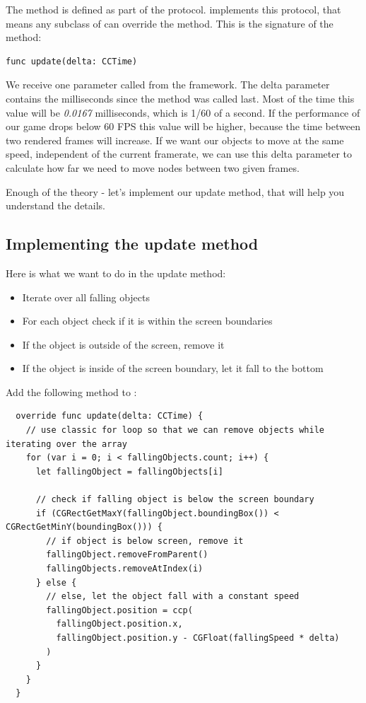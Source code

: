 The  method is defined as part of the
protocol.  implements this protocol, that means any subclass
of  can override the method. This is the signature of the
 method:
\begin{lstlisting}
func update(delta: CCTime)
\end{lstlisting}
We receive one parameter called  from the \cocos{} framework.
The delta parameter contains the milliseconds since the 
method was called last. Most of the time this value will be \textit{0.0167}
milliseconds, which is 1/60 of a second. If the performance of our game drops
below 60 FPS this value will be higher, because the time between two rendered
frames will increase. If we want our objects to move at the same speed,
independent of the current framerate, we can use this delta parameter to
calculate how far we need to move nodes between two given frames.

Enough of the theory - let's implement our update method, that will help you
understand the details.

\subsection{Implementing the update method}
Here is what we want to do in the update method:

\begin{itemize}
  \item Iterate over all falling objects
  \item For each object check if it is within the screen boundaries
  \item If the object is outside of the screen, remove it
  \item If the object is inside of the screen boundary, let it fall to the
  bottom
\end{itemize}

\begin{leftbar}
Add the following  method to :
\begin{lstlisting}
  override func update(delta: CCTime) {
    // use classic for loop so that we can remove objects while iterating over the array
    for (var i = 0; i < fallingObjects.count; i++) {
      let fallingObject = fallingObjects[i]
      
      // check if falling object is below the screen boundary
      if (CGRectGetMaxY(fallingObject.boundingBox()) < CGRectGetMinY(boundingBox())) {
        // if object is below screen, remove it
        fallingObject.removeFromParent()
        fallingObjects.removeAtIndex(i)
      } else {
        // else, let the object fall with a constant speed
        fallingObject.position = ccp(
          fallingObject.position.x,
          fallingObject.position.y - CGFloat(fallingSpeed * delta)
        )
      }
    }
  }
\end{lstlisting}
\end{leftbar}

